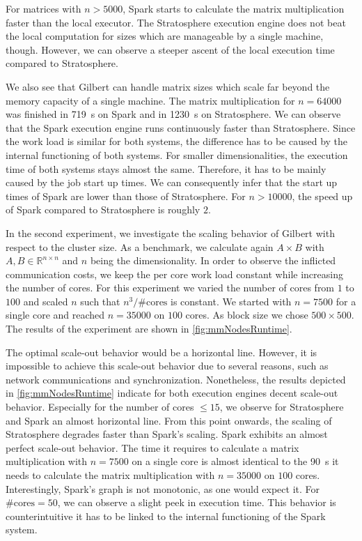 For matrices with $n>5000$, Spark starts to calculate the matrix multiplication faster than the local executor.
The Stratosphere execution engine does not beat the local computation for sizes which are manageable by a single machine, though.
However, we can observe a steeper ascent of the local execution time compared to Stratosphere.

We also see that Gilbert can handle matrix sizes which scale far beyond the memory capacity of a single machine.
The matrix multiplication for $n=64000$ was finished in \SI{719}{\second} on Spark and in \SI{1230}{\second} on Stratosphere.
We can observe that the Spark execution engine runs continuously faster than Stratosphere.
Since the work load is similar for both systems, the difference has to be caused by the internal functioning of both systems.
For smaller dimensionalities, the execution time of both systems stays almost the same.
Therefore, it has to be mainly caused by the job start up times.
We can consequently infer that the start up times of Spark are lower than those of Stratosphere.
For $n>10000$, the speed up of Spark compared to Stratosphere is roughly $2$.

In the second experiment, we investigate the scaling behavior of Gilbert with respect to the cluster size.
As a benchmark, we calculate again $A\times B$ with $A,B \in \mathbb{R}^{n\times n}$ and $n$ being the dimensionality.
In order to observe the inflicted communication costs, we keep the per core work load constant while increasing the number of cores.
For this experiment we varied the number of cores from $1$ to $100$ and scaled $n$ such that $n^3/\#\text{cores}$ is constant.
We started with $n=7500$ for a single core and reached $n=35000$ on $100$ cores.
As block size we chose $500\times 500$.
The results of the experiment are shown in \cref{fig:mmNodesRuntime}.

The optimal scale-out behavior would be a horizontal line.
However, it is impossible to achieve this scale-out behavior due to several reasons, such as network communications and synchronization.
Nonetheless, the results depicted in \cref{fig:mmNodesRuntime} indicate for both execution engines decent scale-out behavior.
Especially for the number of cores $\le 15$, we observe for Stratosphere and Spark an almost horizontal line.
From this point onwards, the scaling of Stratosphere degrades faster than Spark's scaling.
Spark exhibits an almost perfect scale-out behavior.
The time it requires to calculate a matrix multiplication with $n=7500$ on a single core is almost identical to the \SI{90}{\second} it needs to calculate the matrix multiplication with $n=35000$ on $100$ cores.
Interestingly, Spark's graph is not monotonic, as one would expect it.
For $\text{\#cores}=50$, we can observe a slight peek in execution time.
This behavior is counterintuitive it has to be linked to the internal functioning of the Spark system.

